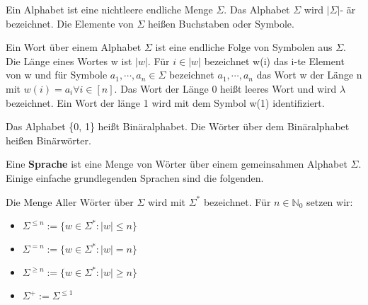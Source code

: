     Ein Alphabet ist eine nichtleere endliche Menge \(\Sigma\). Das Alphabet \(\Sigma\) wird \(\lvert \Sigma \rvert\)- är bezeichnet. Die Elemente von \(\Sigma\) heißen Buchstaben oder Symbole.

    Ein Wort über einem Alphabet \(\Sigma\) ist eine endliche Folge von Symbolen aus \(\Sigma\). Die Länge eines Wortes w ist \(\lvert w \rvert\). Für \(i \in\lvert w \rvert\) bezeichnet w(i) das i-te Element von w und für Symbole \(a_{1}, \cdots, a_{n} \in \Sigma\) bezeichnet \(a_{1}, \cdots, a_{n}\) das Wort w der Länge n mit \(w(i) = a_{i} \forall i\in [n]\). Das Wort der Länge 0 heißt leeres Wort und wird \(\lambda\) bezeichnet. Ein Wort der länge 1 wird mit dem Symbol w(1) identifiziert.

    Das Alphabet \{0, 1\} heißt Binäralphabet. Die Wörter über dem Binäralphabet heißen Binärwörter.

    Eine \textbf{Sprache} ist eine Menge von Wörter über einem gemeinsahmen Alphabet \(\Sigma\). Einige einfache grundlegenden Sprachen sind die folgenden.

    Die Menge Aller Wörter über \(\Sigma\) wird mit \(\Sigma^{*}\) bezeichnet. Für \(n \in \mathbb{N}_{0}\) setzen wir:
    \begin{itemize}
        \item[] \(\Sigma^{\leq n} := \{w \in \Sigma^{*} : \lvert w \rvert \leq n\}\)
        \item[] \(\Sigma^{=n} := \{w \in \Sigma^{*} : \lvert w \rvert = n\}\)
        \item[] \(\Sigma^{\geq n} := \{w \in \Sigma^{*} : \lvert w \rvert \geq n\}\)
        \item[] \(\Sigma^{+} := \Sigma^{\leq 1}\)
    \end{itemize}

